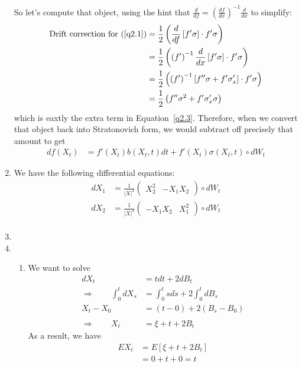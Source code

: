 \documentclass[12pt]{article}
\theoremstyle{plain}
\theoremstyle{definition}
\theoremstyle{remark}
\begin{document}
\begin{enumerate}
    So let's compute that object, using the hint that $\frac{d}{df} =
    \left(\frac{df}{dx}\right)^{-1} \frac{d}{dx}$ to simplify:
    \begin{align*}
      \text{Drift correction for (\ref{q2.1})}
      &= \frac{1}{2}
        \left(
        \frac{d}{df} \left[f' \sigma\right] \cdot f'\sigma
        \right)\\
      &= \frac{1}{2}
        \left(
        \left(f'\right)^{-1} \frac{d}{dx}
        \left[f' \sigma\right] \cdot f'\sigma
        \right)\\
      &= \frac{1}{2}
        \left(
        \left(f'\right)^{-1}
        \left[f'' \sigma + f' \sigma'_x \right] \cdot f'\sigma
        \right)\\
      &= \frac{1}{2}
        \left(
        f'' \sigma^2 + f' \sigma'_x \sigma
        \right)
    \end{align*}
    which is eaxtly the extra term in Equation~\ref{q2.3}. Therefore,
    when we convert that object back into Stratonovich form, we would
    subtract off precisely that amount to get
    \begin{align*}
      df(X_t)
      &= f'(X_t) b(X_t,t) dt + f'(X_t) \sigma(X_t,t) \circ dW_t
    \end{align*}

  \item %
    We have the following differential equations:
    \begin{align*}
      dX_1 &= \frac{1}{|X|^2}
        \begin{pmatrix}
          X_2^2 & -X_1X_2
        \end{pmatrix}
        \circ dW_t \\
      dX_2 &= \frac{1}{|X|^2}
        \begin{pmatrix}
          -X_1X_2 & X_1^2
        \end{pmatrix}
        \circ dW_t \\
    \end{align*}

  \item %

  \item %
    \begin{enumerate}
      \item %
        We want to solve
        \begin{align*}
          dX_t &= t dt + 2 dB_t \\
          \Rightarrow \qquad
          \int^t_0 dX_s &= \int^t_0 s ds + 2 \int^t_0 dB_s \\
          X_t - X_0 &= (t-0) + 2 (B_s - B_0) \\\\
          \Rightarrow \qquad
          X_t &= \xi + t + 2B_t
        \end{align*}
        As a result, we have
        \begin{align*}
          EX_t &= E\left[ \xi + t + 2B_t \right] \\
          &= 0 + t + 0 = t
        \end{align*}


\end{enumerate}
\end{enumerate}
\end{document}

